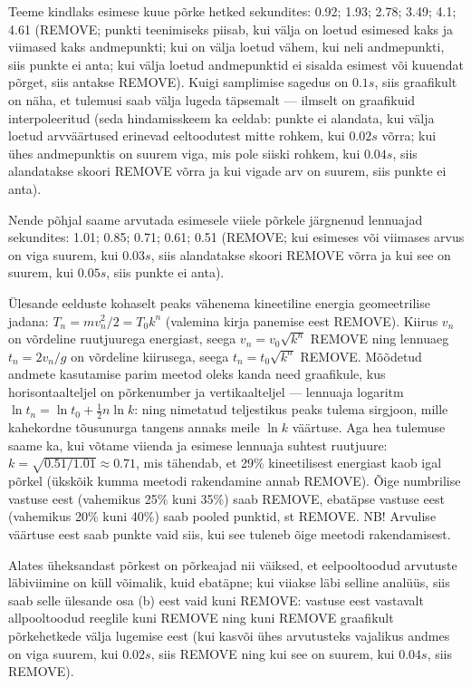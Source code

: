 \documentclass[10pt]{article}
\newcommand{\p}[1]{REMOVE}
\begin{document}
\osa Teeme kindlaks esimese kuue põrke hetked sekundites: \num{0,92}; \num{1,93}; \num{2,78}; \num{3,49}; \num{4,1}; \num{4.61} (\p1; punkti teenimiseks piisab, kui välja on loetud esimesed kaks ja viimased kaks andmepunkti; kui on välja loetud vähem, kui neli andmepunkti, siis punkte ei anta; kui välja loetud andmepunktid ei sisalda esimest või kuuendat põrget, siis antakse \p{0,5}). Kuigi samplimise sagedus on $\SI{0.1}s$, siis graafikult on näha, et tulemusi saab välja lugeda täpsemalt --- ilmselt on graafikuid interpoleeritud (seda hindamisskeem ka eeldab: punkte ei alandata, kui välja loetud arvväärtused erinevad eeltoodutest mitte rohkem, kui $\SI{0.02}s$ võrra; kui ühes andmepunktis on suurem viga, mis pole siiski rohkem, kui  $\SI {0.04}s$, siis alandatakse skoori \p{0,5} võrra ja kui vigade arv on suurem, siis punkte ei anta).

Nende põhjal saame arvutada esimesele viiele põrkele järgnenud lennuajad sekundites: \num{1,01}; \num{0,85}; \num{0,71}; \num{0,61}; \num{0,51} (\p1; kui esimeses või viimases arvus on viga suurem, kui $\SI {0.03}s$, siis alandatakse skoori \p{0,5} võrra ja kui see on suurem, kui $\SI{0.05}s$, siis punkte ei anta).

Ülesande eelduste kohaselt peaks vähenema kineetiline energia geomeetrilise jadana: $T_n=mv_n^2/2=T_0k^n$ (valemina kirja panemise eest \p1). Kiirus $v_n$ on võrdeline ruutjuurega energiast, seega $v_n=v_0\sqrt{k^n}$ \p1 ning lennuaeg $t_n=2v_n/g$ on võrdeline kiirusega, seega $t_n=t_0\sqrt{k^n}$ \p1. Mõõdetud andmete kasutamise parim meetod oleks kanda need graafikule, kus horisontaalteljel on põrkenumber ja vertikaalteljel --- lennuaja logaritm $\ln t_n=\ln t_0 + \frac 12n\ln k$:  ning nimetatud teljestikus peaks tulema sirgjoon, mille kahekordne tõusunurga tangens annaks meile $\ln k$ väärtuse. Aga hea tulemuse saame ka, kui võtame viienda ja esimese lennuaja suhtest ruutjuure:  $k=\sqrt{0.51/1.01}\approx 0.71$, mis tähendab, et 29\% kineetilisest energiast kaob igal põrkel (ükskõik kumma meetodi rakendamine annab \p1). Õige numbrilise vastuse eest (vahemikus 25\% kuni 35\%) saab \p1, ebatäpse vastuse eest (vahemikus 20\% kuni 40\%) saab pooled punktid, st \p{0,5}. NB! Arvulise väärtuse eest saab punkte vaid siis, kui see tuleneb õige meetodi rakendamisest.

\osa Alates üheksandast põrkest on põrkeajad nii väiksed, et eelpooltoodud arvutuste läbiviimine on küll võimalik, kuid ebatäpne; kui viiakse läbi selline analüüs, siis saab selle ülesande osa (b) eest vaid kuni \p2: vastuse eest vastavalt allpooltoodud reeglile kuni \p1 ning kuni \p1 graafikult põrkehetkede välja lugemise eest (kui kasvõi ühes arvutusteks vajalikus andmes on viga suurem, kui $\SI{0.02}s$, siis \p{0,5} ning kui see on suurem, kui $\SI{0.04}s$, siis \p0).
\end{document}
